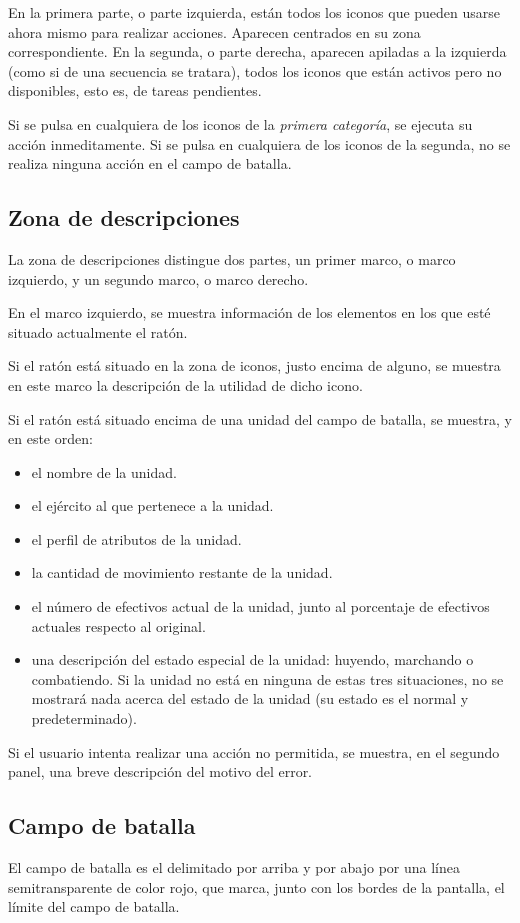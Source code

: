 En la primera parte, o parte izquierda, están todos los iconos que
pueden usarse ahora mismo para realizar acciones. Aparecen centrados
en su zona correspondiente. En la segunda, o parte derecha, aparecen
apiladas a la izquierda (como si de una secuencia se tratara), todos
los iconos que están activos pero no disponibles, esto es, de tareas
pendientes.

Si se pulsa en cualquiera de los iconos de la \textit{primera
  categoría}, se ejecuta su acción inmeditamente. Si se pulsa en
cualquiera de los iconos de la segunda, no se realiza ninguna acción
en el campo de batalla.

\subsection*{Zona de descripciones}
La zona de descripciones distingue dos partes, un primer marco, o
marco izquierdo, y un segundo marco, o marco derecho.

En el marco izquierdo, se muestra información de los elementos en los
que esté situado actualmente el ratón.

Si el ratón está situado en la zona de iconos, justo encima de alguno,
se muestra en este marco la descripción de la utilidad de dicho icono.

Si el ratón está situado encima de una unidad del campo de batalla, se
muestra, y en este orden:

\begin{itemize}
\item el nombre de la unidad.
\item el ejército al que pertenece a la unidad.
\item el perfil de atributos de la unidad.
\item la cantidad de movimiento restante de la unidad.
\item el número de efectivos actual de la unidad, junto al porcentaje
  de efectivos actuales respecto al original.
\item una descripción del estado especial de la unidad: huyendo,
  marchando o combatiendo. Si la unidad no está en ninguna de estas
  tres situaciones, no se mostrará nada acerca del estado de la unidad
  (su estado es el normal y predeterminado).
\end{itemize}

Si el usuario intenta realizar una acción no permitida, se muestra, en
el segundo panel, una breve descripción del motivo del error.

\subsection*{Campo de batalla}
El campo de batalla es el delimitado por arriba y por abajo por una
línea semitransparente de color rojo, que marca, junto con los bordes
de la pantalla, el límite del campo de batalla.

